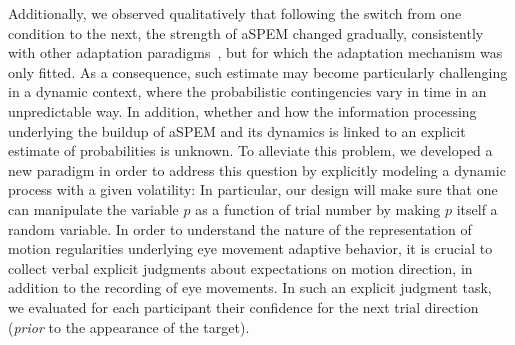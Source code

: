 \documentclass[12pt,english]{article}%
\newcommand{\citep}[1]{\parencite{#1}}
\newcommand{\seeFig}[1]{Figure~\ref{fig:#1}}
\begin{document}
Additionally, we observed qualitatively that following the switch from
one condition to the next,
the strength of aSPEM changed gradually,
consistently with other adaptation paradigms~\citep{Fukushima1996,Kahlon1996,Souto13},
but for which the adaptation mechanism was only fitted.
As a consequence, such estimate may become particularly
challenging in a dynamic context,
where the probabilistic contingencies vary in time in an unpredictable way.
In addition, whether and how the information processing underlying
the buildup of aSPEM and its dynamics is linked to
an explicit estimate of probabilities is unknown.
To alleviate this problem, we developed a new paradigm
in order to address this question
by explicitly modeling a dynamic process with a given volatility:
In particular, our design will make sure that one can manipulate the variable $p$
as a function of trial number by making $p$ itself a random variable. %
In order to understand the nature of the representation of motion regularities underlying eye movement adaptive behavior, it is crucial to collect verbal explicit judgments about expectations on motion direction, in addition to the recording of eye movements.
In such an explicit judgment task, we evaluated for each participant their confidence for the next trial direction
(\emph{prior} to the appearance of the target).
\end{document}
